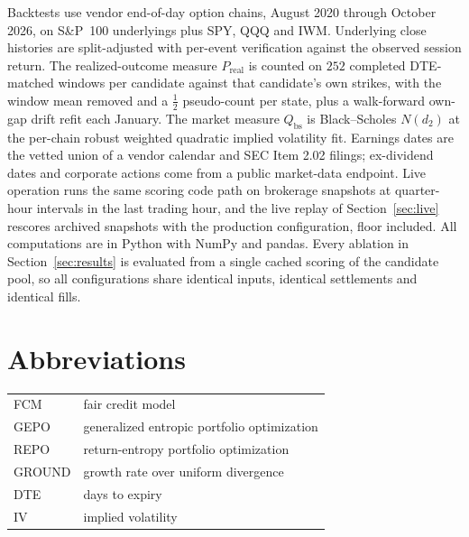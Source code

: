 \documentclass[11pt]{article}
\newcommand{\Preal}{P_{\mathrm{real}}}
\newcommand{\Qbs}{Q_{\mathrm{bs}}}
\begin{document}
Backtests use vendor end-of-day option chains, August 2020 through October
2026, on S\&P~100 underlyings plus SPY, QQQ and IWM. Underlying close histories are
split-adjusted with per-event verification against the observed session
return. The realized-outcome measure $\Preal$ is counted on $252$ completed
DTE-matched windows per candidate against that candidate's own strikes, with
the window mean removed and a $\tfrac12$ pseudo-count per state, plus a
walk-forward own-gap drift refit each January. The market measure $\Qbs$ is
Black--Scholes $N(d_2)$ at the per-chain robust weighted quadratic implied
volatility fit. Earnings dates are the vetted union of a vendor calendar and
SEC Item 2.02 filings; ex-dividend dates and corporate actions come from a
public market-data endpoint. Live operation runs the same scoring code path on
brokerage snapshots at quarter-hour intervals in the last trading hour, and
the live replay of Section~\ref{sec:live} rescores archived snapshots with the
production configuration, floor included. All computations are in Python with NumPy and pandas. Every
ablation in Section~\ref{sec:results} is evaluated from a single cached
scoring of the candidate pool, so all configurations share identical inputs,
identical settlements and identical fills.

\section*{Abbreviations}

\begin{tabular}{ll}
FCM & fair credit model \\
GEPO & generalized entropic portfolio optimization \\
REPO & return-entropy portfolio optimization \\
GROUND & growth rate over uniform divergence \\
DTE & days to expiry \\
IV & implied volatility \\
\end{tabular}
\end{document}
